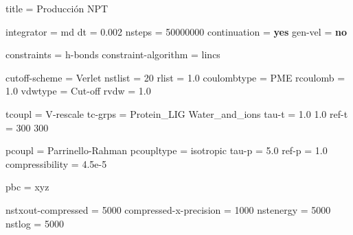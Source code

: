 \documentclass[
  spanish,
  11pt,
  a4paper]{article}
\newenvironment{Shaded}{\begin{snugshade}}{\end{snugshade}}
\newcommand{\DataTypeTok}[1]{\textcolor[rgb]{0.13,0.29,0.53}{#1}}
\newcommand{\DecValTok}[1]{\textcolor[rgb]{0.00,0.00,0.81}{#1}}
\newcommand{\FloatTok}[1]{\textcolor[rgb]{0.00,0.00,0.81}{#1}}
\newcommand{\KeywordTok}[1]{\textcolor[rgb]{0.13,0.29,0.53}{\textbf{#1}}}
\newcommand{\OtherTok}[1]{\textcolor[rgb]{0.56,0.35,0.01}{#1}}
\newcommand{\StringTok}[1]{\textcolor[rgb]{0.31,0.60,0.02}{#1}}
\begin{document}
\begin{Shaded}
\begin{Highlighting}[]
\DataTypeTok{title                    }\OtherTok{=}\StringTok{ Producción NPT}

\DataTypeTok{integrator               }\OtherTok{=}\StringTok{ md}
\DataTypeTok{dt                       }\OtherTok{=}\StringTok{ }\FloatTok{0.002}
\DataTypeTok{nsteps                   }\OtherTok{=}\StringTok{ }\DecValTok{50000000}
\DataTypeTok{continuation             }\OtherTok{=}\StringTok{ }\KeywordTok{yes}
\DataTypeTok{gen{-}vel                  }\OtherTok{=}\StringTok{ }\KeywordTok{no}

\DataTypeTok{constraints              }\OtherTok{=}\StringTok{ h{-}bonds}
\DataTypeTok{constraint{-}algorithm     }\OtherTok{=}\StringTok{ lincs}

\DataTypeTok{cutoff{-}scheme            }\OtherTok{=}\StringTok{ Verlet}
\DataTypeTok{nstlist                  }\OtherTok{=}\StringTok{ }\DecValTok{20}
\DataTypeTok{rlist                    }\OtherTok{=}\StringTok{ }\FloatTok{1.0}
\DataTypeTok{coulombtype              }\OtherTok{=}\StringTok{ PME}
\DataTypeTok{rcoulomb                 }\OtherTok{=}\StringTok{ }\FloatTok{1.0}
\DataTypeTok{vdwtype                  }\OtherTok{=}\StringTok{ Cut{-}off}
\DataTypeTok{rvdw                     }\OtherTok{=}\StringTok{ }\FloatTok{1.0}

\DataTypeTok{tcoupl                   }\OtherTok{=}\StringTok{ V{-}rescale}
\DataTypeTok{tc{-}grps                  }\OtherTok{=}\StringTok{ Protein\_LIG Water\_and\_ions}
\DataTypeTok{tau{-}t                    }\OtherTok{=}\StringTok{ 1.0 1.0}
\DataTypeTok{ref{-}t                    }\OtherTok{=}\StringTok{ 300 300}

\DataTypeTok{pcoupl                   }\OtherTok{=}\StringTok{ Parrinello{-}Rahman}
\DataTypeTok{pcoupltype               }\OtherTok{=}\StringTok{ isotropic}
\DataTypeTok{tau{-}p                    }\OtherTok{=}\StringTok{ }\FloatTok{5.0}
\DataTypeTok{ref{-}p                    }\OtherTok{=}\StringTok{ }\FloatTok{1.0}
\DataTypeTok{compressibility          }\OtherTok{=}\StringTok{ 4.5e{-}5}

\DataTypeTok{pbc                      }\OtherTok{=}\StringTok{ xyz}

\DataTypeTok{nstxout{-}compressed       }\OtherTok{=}\StringTok{ }\DecValTok{5000}
\DataTypeTok{compressed{-}x{-}precision   }\OtherTok{=}\StringTok{ }\DecValTok{1000}
\DataTypeTok{nstenergy                }\OtherTok{=}\StringTok{ }\DecValTok{5000}
\DataTypeTok{nstlog                   }\OtherTok{=}\StringTok{ }\DecValTok{5000}
\end{Highlighting}
\end{Shaded}
\end{document}
